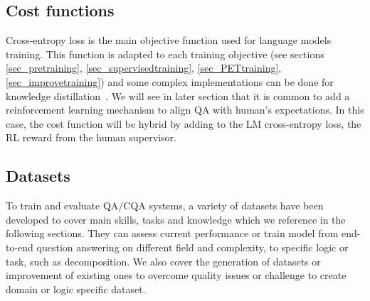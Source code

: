 \documentclass[acmsmall]{acmart}
\begin{document}
\subsection{Cost functions}
Cross-entropy loss is the main objective function used for language models training. This function is adapted to each training objective (see sections \ref{sec_pretraining}, \ref{sec_supervisedtraining}, \ref{sec_PETtraining}, \ref{sec_improvetraining}) and some complex implementations can be done for knowledge distillation~\citep{wuOneTeacherEnough2021}. We will see in later section that it is common to add a reinforcement learning mechanism to align QA with human's expectations. In this case, the cost function will be hybrid by adding to the LM cross-entropy loss, the RL reward from the human supervisor\citep{ouyangTrainingLanguageModels2022}.
        
\subsection{Datasets}
    To train and evaluate QA/CQA systems, a variety of datasets have been developed to cover main skills, tasks and knowledge which we reference in the following sections. They can assess current performance or train model from end-to-end question answering on different field and complexity, to specific logic or task, such as decomposition. We also cover the generation of datasets or improvement of existing ones to overcome quality issues or challenge to create domain or logic specific dataset.
\end{document}
